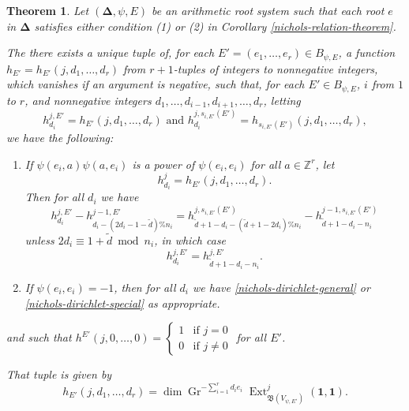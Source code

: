 \documentclass[11pt,letterpaper]{article}
\newtheorem{theorem}{Theorem}[section]
\theoremstyle{definition}
\theoremstyle{remark}
\numberwithin{equation}{section}
\theoremstyle{dotless}
\newcommand{\Gr}{\operatorname{Gr}}
\newcommand{\hchi}{\psi} %
\renewcommand{\tilde}{\widetilde}
\begin{document}
\begin{theorem}\label{nichols-determination-theorem} Let $(\mathbf \Delta, \hchi, E)$ be an arithmetic root system such that each root $e$ in $ \mathbf \Delta$ satisfies either condition (1) or (2) in Corollary \ref{nichols-relation-theorem}. 

The there exists a unique tuple of, for each $E'=(e_1,\dots,e_r)\in B_{\hchi, E}$, a function $h_{E'} = h_{E'}(j,d_1,\dots, d_r)$ from $r+1$-tuples of integers to nonnegative integers, which vanishes if an argument is negative, such that, for each $E' \in B_{\hchi,E}$, $i$ from $1$ to $r$, and nonnegative integers $d_1,\dots, d_{i-1}, d_{i+1},\dots, d_r$, letting 
\[ h^{j,E'}_{d_i}= h_{E'} (j, d_1,\dots,d_r)  \textrm{ and } h^{j,s_{i,E'}(E')}_{d_i}= h_{s_{i,E'}(E')} (j, d_1,\dots,d_r) ,\]
we have the following:
 
\begin{enumerate}
    \item If $\hchi(e_i,a)\hchi(a,e_i)$ is a power of $\hchi(e_i,e_i) $ for all $a\in \mathbb Z^r$, let \[ h^j_{d_i}= h_{E'} (j, d_1,\dots,d_r) .\] Then for all $d_i$ we have 
    \begin{equation}\label{asymmetric-kubota-general} h^{j,E'}_{d_i} - h^{j-1,E'}_{d_i - (2d_i-1-\tilde{d})\%n_i} = h^{j,s_{i,E'}(E')}_{\tilde{d}+1-d_i - (\tilde{d}+1-2d_i)\% n_i} - h^{j-1,s_{i,E'}(E')}_{\tilde{d}+1-d_i-n_i} \end{equation}
    unless $2d_i \equiv 1 + \tilde{d}\bmod n_i$, in which case 
    \begin{equation}\label{asymmetric-kubota-special} h^{j,E'}_{d_i} = h^{j,E'}_{\tilde{d}+1-d_i-n_i}.\end{equation}
\item If $\hchi(e_i,e_i)=-1$, then for all $d_i$ we have \eqref{nichols-dirichlet-general} or \eqref{nichols-dirichlet-special} as appropriate.
\end{enumerate}
and such that $h^{E'}(j,0,\dots,0)=\begin{cases} 1 & \textrm{if } j=0 \\ 0 & \textrm{if } j \neq 0 \end{cases}$ for all $E'$.

That tuple is given by \[ h_{E'}(j, d_1,\dots, d_r) =  \dim \Gr^{ -\sum_{i=1}^r d_i e_i}  \operatorname{Ext}^{j } _{ \mathfrak B( V_{\hchi,E'} )} (\mathbf 1, \mathbf 1) .\]\end{theorem}
  
\end{document}
